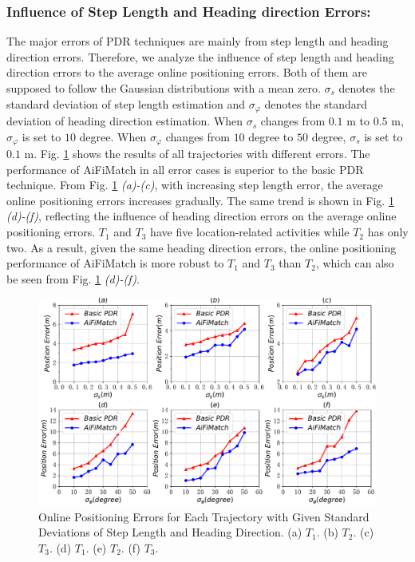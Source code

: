 \documentclass{llncs}
\begin{document}
\subsubsection{Influence of Step Length and Heading direction Errors: }

The major errors of PDR techniques are mainly from step length and heading direction errors. Therefore, we analyze the influence of step length and heading direction errors to the average online positioning errors. Both of them are supposed to follow the Gaussian distributions with a mean zero. $\sigma_s$ denotes the standard deviation of step length estimation and $\sigma_{\varphi}$ denotes the standard deviation of heading direction estimation. When $\sigma_s$ changes from $0.1$ m to $0.5$ m, $\sigma_{\varphi}$ is set to $10$ degree. When $\sigma_{\varphi}$ changes from $10$ degree to $50$ degree, $\sigma_s$ is set to $0.1$ m. Fig. \ref{fig-errinfluence} shows the results of all trajectories with different errors. The performance of AiFiMatch in all error cases is superior to the basic PDR technique. From Fig. \ref{fig-errinfluence} \emph{(a)-(c)}, with increasing step length error, the average online positioning errors increases gradually. The same trend is shown in Fig. \ref{fig-errinfluence} \emph{(d)-(f)}, reflecting the influence of heading direction errors on the average online positioning errors. $T_1$ and $T_3$ have five location-related activities while $T_2$ has only two. As a result, given the same heading direction errors, the online positioning performance of AiFiMatch is more robust to $T_1$ and $T_3$ than $T_2$, which can also be seen from Fig. \ref{fig-errinfluence} \emph{(d)-(f)}.

\vspace{-10pt}
\begin{figure}[!htbp]
	\centering
	\includegraphics[width=4.56in]{AiFiMatch-ErrInfluence}
	\caption{Online Positioning Errors for Each Trajectory with Given Standard Deviations of Step Length and Heading Direction. (a) $T_1$. (b) $T_2$. (c) $T_3$. (d) $T_1$. (e) $T_2$. (f) $T_3$.}
	\label{fig-errinfluence}
\end{figure}
\vspace{-10pt}
\end{document}
